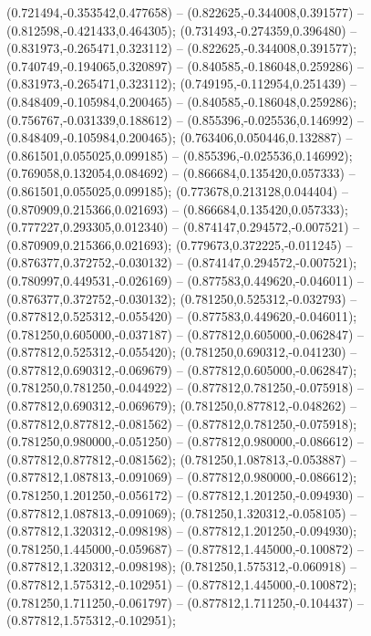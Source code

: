  (0.721494,-0.353542,0.477658) -- (0.822625,-0.344008,0.391577) -- (0.812598,-0.421433,0.464305);
 (0.731493,-0.274359,0.396480) -- (0.831973,-0.265471,0.323112) -- (0.822625,-0.344008,0.391577);
 (0.740749,-0.194065,0.320897) -- (0.840585,-0.186048,0.259286) -- (0.831973,-0.265471,0.323112);
 (0.749195,-0.112954,0.251439) -- (0.848409,-0.105984,0.200465) -- (0.840585,-0.186048,0.259286);
 (0.756767,-0.031339,0.188612) -- (0.855396,-0.025536,0.146992) -- (0.848409,-0.105984,0.200465);
 (0.763406,0.050446,0.132887) -- (0.861501,0.055025,0.099185) -- (0.855396,-0.025536,0.146992);
 (0.769058,0.132054,0.084692) -- (0.866684,0.135420,0.057333) -- (0.861501,0.055025,0.099185);
 (0.773678,0.213128,0.044404) -- (0.870909,0.215366,0.021693) -- (0.866684,0.135420,0.057333);
 (0.777227,0.293305,0.012340) -- (0.874147,0.294572,-0.007521) -- (0.870909,0.215366,0.021693);
 (0.779673,0.372225,-0.011245) -- (0.876377,0.372752,-0.030132) -- (0.874147,0.294572,-0.007521);
 (0.780997,0.449531,-0.026169) -- (0.877583,0.449620,-0.046011) -- (0.876377,0.372752,-0.030132);
 (0.781250,0.525312,-0.032793) -- (0.877812,0.525312,-0.055420) -- (0.877583,0.449620,-0.046011);
 (0.781250,0.605000,-0.037187) -- (0.877812,0.605000,-0.062847) -- (0.877812,0.525312,-0.055420);
 (0.781250,0.690312,-0.041230) -- (0.877812,0.690312,-0.069679) -- (0.877812,0.605000,-0.062847);
 (0.781250,0.781250,-0.044922) -- (0.877812,0.781250,-0.075918) -- (0.877812,0.690312,-0.069679);
 (0.781250,0.877812,-0.048262) -- (0.877812,0.877812,-0.081562) -- (0.877812,0.781250,-0.075918);
 (0.781250,0.980000,-0.051250) -- (0.877812,0.980000,-0.086612) -- (0.877812,0.877812,-0.081562);
 (0.781250,1.087813,-0.053887) -- (0.877812,1.087813,-0.091069) -- (0.877812,0.980000,-0.086612);
 (0.781250,1.201250,-0.056172) -- (0.877812,1.201250,-0.094930) -- (0.877812,1.087813,-0.091069);
 (0.781250,1.320312,-0.058105) -- (0.877812,1.320312,-0.098198) -- (0.877812,1.201250,-0.094930);
 (0.781250,1.445000,-0.059687) -- (0.877812,1.445000,-0.100872) -- (0.877812,1.320312,-0.098198);
 (0.781250,1.575312,-0.060918) -- (0.877812,1.575312,-0.102951) -- (0.877812,1.445000,-0.100872);
 (0.781250,1.711250,-0.061797) -- (0.877812,1.711250,-0.104437) -- (0.877812,1.575312,-0.102951);
